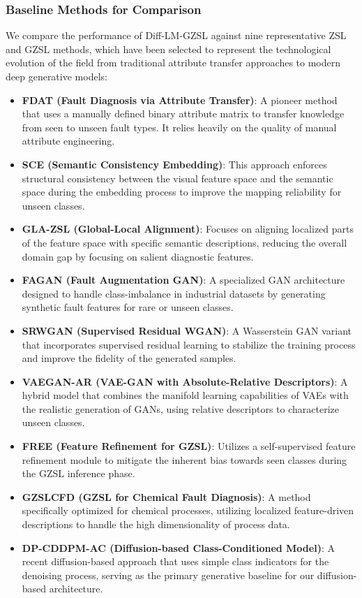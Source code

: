 \documentclass[journal]{IEEEtran}
\begin{document}
\subsubsection{Baseline Methods for Comparison}
We compare the performance of Diff-LM-GZSL against nine representative ZSL and GZSL methods, which have been selected to represent the technological evolution of the field from traditional attribute transfer approaches to modern deep generative models:
\begin{itemize}
    \item \textbf{FDAT (Fault Diagnosis via Attribute Transfer)}: A pioneer method that uses a manually defined binary attribute matrix to transfer knowledge from seen to unseen fault types. It relies heavily on the quality of manual attribute engineering.
    \item \textbf{SCE (Semantic Consistency Embedding)}: This approach enforces structural consistency between the visual feature space and the semantic space during the embedding process to improve the mapping reliability for unseen classes.
    \item \textbf{GLA-ZSL (Global-Local Alignment)}: Focuses on aligning localized parts of the feature space with specific semantic descriptions, reducing the overall domain gap by focusing on salient diagnostic features.
    \item \textbf{FAGAN (Fault Augmentation GAN)}: A specialized GAN architecture designed to handle class-imbalance in industrial datasets by generating synthetic fault features for rare or unseen classes.
    \item \textbf{SRWGAN (Supervised Residual WGAN)}: A Wasserstein GAN variant that incorporates supervised residual learning to stabilize the training process and improve the fidelity of the generated samples.
    \item \textbf{VAEGAN-AR (VAE-GAN with Absolute-Relative Descriptors)}: A hybrid model that combines the manifold learning capabilities of VAEs with the realistic generation of GANs, using relative descriptors to characterize unseen classes.
    \item \textbf{FREE (Feature Refinement for GZSL)}: Utilizes a self-supervised feature refinement module to mitigate the inherent bias towards seen classes during the GZSL inference phase.
    \item \textbf{GZSLCFD (GZSL for Chemical Fault Diagnosis)}: A method specifically optimized for chemical processes, utilizing localized feature-driven descriptions to handle the high dimensionality of process data.
    \item \textbf{DP-CDDPM-AC (Diffusion-based Class-Conditioned Model)}: A recent diffusion-based approach that uses simple class indicators for the denoising process, serving as the primary generative baseline for our diffusion-based architecture.
\end{itemize}
\end{document}
